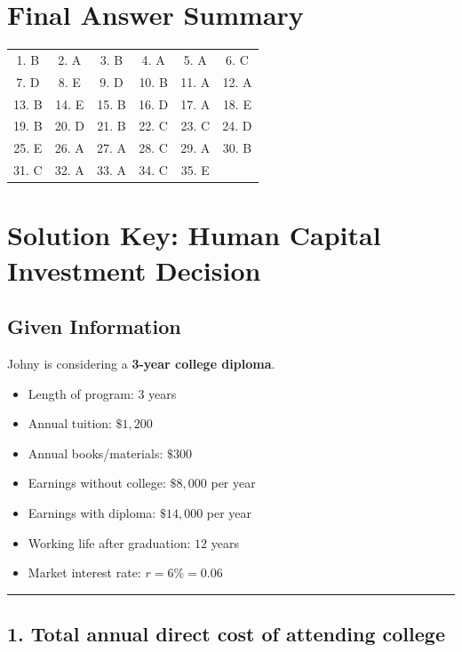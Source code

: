 \documentclass[12pt]{article}
\begin{document}
\section*{Final Answer Summary}

\begin{center}
\begin{tabular}{cccccc}
1. B & 2. A & 3. B & 4. A & 5. A & 6. C \\
7. D & 8. E & 9. D & 10. B & 11. A & 12. A \\
13. B & 14. E & 15. B & 16. D & 17. A & 18. E \\
19. B & 20. D & 21. B & 22. C & 23. C & 24. D \\
25. E & 26. A & 27. A & 28. C & 29. A & 30. B \\
31. C & 32. A & 33. A & 34. C & 35. E \\
\end{tabular}
\end{center}



\section*{Solution Key: Human Capital Investment Decision}

\subsection*{Given Information}

Johny is considering a \textbf{3-year college diploma}.

\begin{itemize}
    \item Length of program: \(3\) years
    \item Annual tuition: \(\$1{,}200\)
    \item Annual books/materials: \(\$300\)
    \item Earnings without college: \(\$8{,}000\) per year
    \item Earnings with diploma: \(\$14{,}000\) per year
    \item Working life after graduation: \(12\) years
    \item Market interest rate: \(r = 6\% = 0.06\)
\end{itemize}

\hrule
\vspace{0.5em}

\subsection*{1. Total annual direct cost of attending college}
\end{document}
